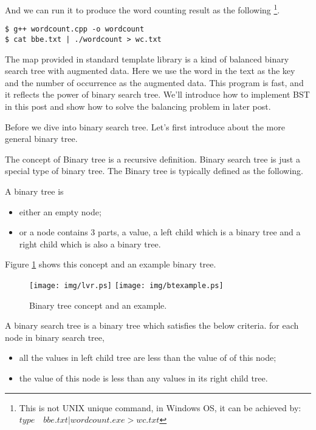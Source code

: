 \documentclass{article}
\begin{document}
And we can run it to produce the word counting result as the following
\footnote{This is not UNIX unique command, in Windows OS, it can be achieved
by: $type \quad bbe.txt | wordcount.exe > wc.txt$}.

\begin{verbatim}
$ g++ wordcount.cpp -o wordcount
$ cat bbe.txt | ./wordcount > wc.txt
\end{verbatim}

The map provided in standard template library is a kind of balanced binary search tree
with augmented data. Here we use the word in the text as the key and the number of 
occurrence as the augmented data. This program is fast, and it reflects the power of
binary search tree. We'll introduce how to implement BST in this post and show how
to solve the balancing problem in later post.

Before we dive into binary search tree. Let's first introduce about
the more general binary tree.

The concept of Binary tree is a recursive definition. Binary search tree is just a special 
type of binary tree. The Binary tree is typically defined as the following.

A binary tree is 
\begin{itemize}
\item either an empty node;
\item or a node contains 3 parts, a value, a left child which is a binary tree and a 
right child which is also a binary tree.
\end{itemize}

Figure \ref{fig:binary-tree-example} shows this concept and an example binary tree.

\begin{figure}[htbp]
       \begin{center}
	\texttt{[image: img/lvr.ps]}
        \texttt{[image: img/btexample.ps]}
        \caption{Binary tree concept and an example.} \label{fig:binary-tree-example}
       \end{center}
\end{figure}

A binary search tree is a binary tree which satisfies the below criteria.
for each node in binary search tree,
\begin{itemize}
\item all the values in left child tree are less than the value of of this node;
\item the value of this node is less than any values in its right child tree.
\end{itemize}
\end{document}
